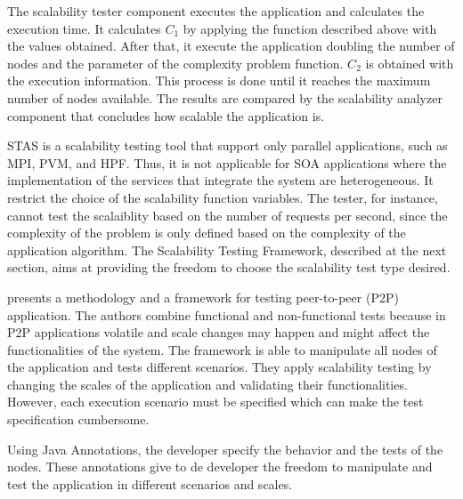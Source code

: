 The scalability tester component executes the application and calculates the execution time.  It calculates $C_1$ by applying the function described above with the values obtained. After that, it execute the application doubling the number of nodes and the parameter of the complexity problem function. $C_2$ is obtained with the execution information. This process is done until it reaches the maximum number of nodes available. The results are compared by the scalability analyzer component that concludes how scalable the application is.

STAS is a scalability testing tool that support only parallel applications, such as MPI, PVM, and HPF. Thus, it is not applicable for SOA applications where the implementation of the services that integrate the system are heterogeneous. It restrict the choice of the scalability function variables. The tester, for instance, cannot test the scalaiblity based on the number of requests per second, since the complexity of the problem is only defined based on the complexity of the application algorithm. The Scalability Testing Framework, described at the next section, aims at providing the freedom to choose the scalability test type desired.

\cite{p2p} presents a methodology and a framework for testing peer-to-peer (P2P) application. The authors combine functional and non-functional tests because in P2P applications volatile and scale changes may happen and might affect the functionalities of the system. The framework is able to manipulate all nodes of the application and tests different scenarios. They apply scalability testing by changing the scales of the application and validating their functionalities. However, each execution scenario must be specified which can make the test specification cumbersome.

Using Java Annotations, the developer specify the behavior and the tests of the nodes. These annotations give to de developer the freedom to manipulate and test the application in different scenarios and scales.











